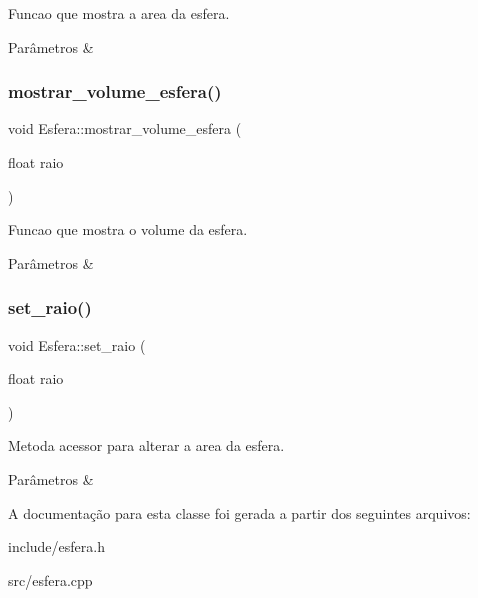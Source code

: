 Funcao que mostra a area da esfera. 


\begin{DoxyParams}{Parâmetros}
{\em } & \\
\hline
\end{DoxyParams}
\mbox{\label{classEsfera_a8cc5291f2278d1664a75650ee6889f02}} 
\subsubsection{\texorpdfstring{mostrar\+\_\+volume\+\_\+esfera()}{mostrar\_volume\_esfera()}}
{\footnotesize\ttfamily void Esfera\+::mostrar\+\_\+volume\+\_\+esfera (\begin{DoxyParamCaption}\item[{float}]{raio }\end{DoxyParamCaption})}



Funcao que mostra o volume da esfera. 


\begin{DoxyParams}{Parâmetros}
{\em } & \\
\hline
\end{DoxyParams}
\mbox{\label{classEsfera_ae4bb91e7baef60aacab71a73a4a4d06f}} 
\subsubsection{\texorpdfstring{set\+\_\+raio()}{set\_raio()}}
{\footnotesize\ttfamily void Esfera\+::set\+\_\+raio (\begin{DoxyParamCaption}\item[{float}]{raio }\end{DoxyParamCaption})}



Metoda acessor para alterar a area da esfera. 


\begin{DoxyParams}{Parâmetros}
{\em } & \\
\hline
\end{DoxyParams}


A documentação para esta classe foi gerada a partir dos seguintes arquivos\+:\begin{DoxyCompactItemize}
\item 
include/esfera.\+h\item 
src/esfera.\+cpp\end{DoxyCompactItemize}
